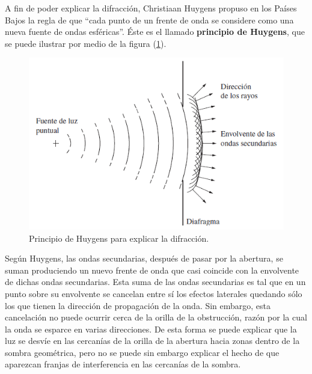 \documentclass[14pt]{extarticle}
\begin{document}
A fin de poder explicar la difracción, Christiaan Huygens propuso en los Países Bajos la regla de que \enquote{cada punto de un frente de onda se considere como una nueva fuente de ondas esféricas}. Éste es el llamado \textbf{principio de Huygens}, que se puede ilustrar por medio de la figura (\ref{fig:figura_X_02}).
\begin{figure}[H]
    \centering
    \includegraphics[scale=0.75]{Imagenes/Difraccion_02.png}
    \caption{Principio de Huygens para explicar la difracción.}
    \label{fig:figura_X_02}
\end{figure}
Según Huygens, las ondas secundarias, después de pasar por la abertura, se suman produciendo un nuevo frente de onda que casi coincide con la envolvente de dichas ondas secundarias. Esta suma de las ondas secundarias es tal que en un punto sobre su envolvente se cancelan entre sí los efectos laterales quedando sólo los que tienen la dirección de propagación de la onda. Sin embargo, esta cancelación no puede ocurrir cerca de la orilla de la obstrucción, razón por la cual la onda se esparce en varias direcciones. De esta forma se puede explicar que la luz se desvíe en las cercanías de la orilla de la abertura hacia zonas dentro de la sombra geométrica, pero no se puede sin embargo explicar el hecho de que aparezcan franjas de interferencia en las cercanías de la sombra.
\end{document}
